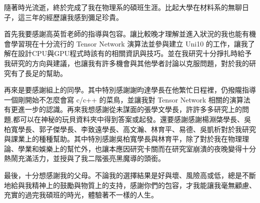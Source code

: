 \begin{acknowledgementszh}
隨著時光流逝，終於完成了我在物理系的碩班生涯。比起大學在材料系的無聊日子，這三年的經歷讓我感到彌足珍貴。

首先我要感謝高英哲老師的指導與包容。讓比較晚才理解並進入狀況的我也能有機會學習現在十分流行的 Tensor Network 演算法並參與建立 Uni10 的工作，讓我了解在設計CPU與GPU程式時該有的相關資訊與技巧。並在我研究十分掙扎時給予我研究的方向與建議，也讓我有許多機會與其他學者討論以克服問題，對於我的研究有了長足的幫助。

再來是要感謝組上的同學。其中特別感謝謝昀達學長在他繁忙日程裡，仍撥隴指導一個剛開始不怎麼會寫 c/c++ 的菜鳥，並讓我對 Tensor Network 相關的演算法有更進一步的認識。再來我想感謝從未謀面的張學文學長，許許多多研究上的問題,都可以在神秘的玩貝資料夾中得到答案或起發。還要感謝感謝楊淵棨學長、吳柏寬學長、郭子傑學長、李致遠學長、高文瀚、林育平、易德、吳凱析對於我研究與課業上的種種幫助。其中特別感謝吳柏寬學長與林育平，除了對於我在物理理論、學業和娛樂上的幫忙外，也讓本應因研究卡關而在研究室崩潰的夜晚變得十分熱鬧充滿活力，並授與了我二階張亮黑魔導的頭銜。

最後，十分想感謝我的父母。不論我的選擇結果是好與壞、風險高或低，總是不斷地給與我精神上的鼓勵與物質上的支持，感謝你們的包容，才我能讓我毫無顧慮、充實的過完我碩班的時光，體驗著不一樣的人生。
\end{acknowledgementszh}

